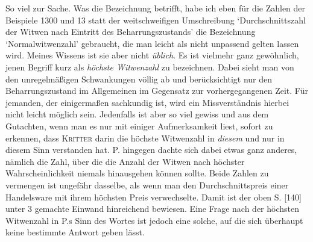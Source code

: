 So viel zur Sache. Was die Bezeichnung betrifft, habe ich eben für die Zahlen der Beispiele 1300 und 13 statt der weitschweifigen Umschreibung ‘Durchschnittszahl der Witwen nach Eintritt des Beharrungszustands’ die Bezeichnung ‘Normalwitwenzahl’ gebraucht, die man leicht als nicht unpassend gelten lassen wird. Meines Wissens ist sie aber nicht \textit{üblich}. Es ist vielmehr ganz gewöhnlich, jenen Begriff kurz als \textit{höchste Witwenzahl} zu bezeichnen. Dabei sieht man von den unregelmäßigen Schwankungen völlig ab und berücksichtigt nur den Beharrungszustand im Allgemeinen im Gegensatz zur vorhergegangenen Zeit. Für jemanden, der einigermaßen sachkundig ist, wird ein Missverständnis hierbei nicht leicht möglich sein. Jedenfalls ist aber so viel gewiss und aus dem Gutachten, wenn man es nur mit einiger Aufmerksamkeit liest, sofort zu erkennen, dass \textsc{Kritter} darin die höchste Witwenzahl in \textit{diesem} und nur in diesem Sinn verstanden hat. P. hingegen dachte sich dabei etwas ganz anderes, nämlich die Zahl, über die die Anzahl der Witwen nach höchster Wahrscheinlichkeit niemals hinausgehen können sollte. Beide Zahlen zu vermengen ist ungefähr dasselbe, als wenn man den Durchschnittspreis einer Handelsware mit ihrem höchsten Preis verwechselte. Damit ist der oben S. [140] unter 3 gemachte Einwand hinreichend bewiesen. Eine Frage nach der höchsten Witwenzahl in P.s Sinn des Wortes ist jedoch eine solche, auf die sich überhaupt keine bestimmte Antwort geben lässt.
